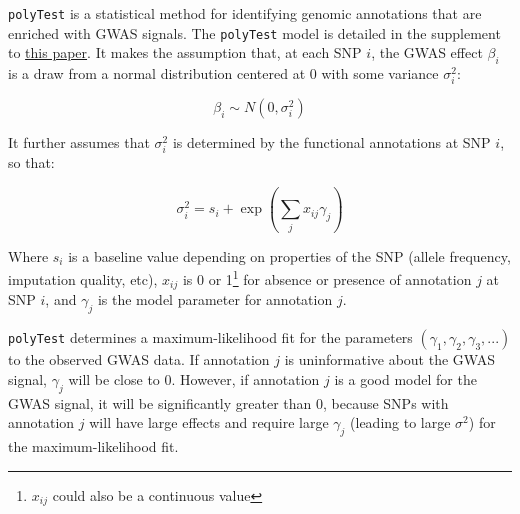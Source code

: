 \documentclass[12pt]{scrartcl}
\begin{document}
\maketitle

\texttt{polyTest} is a statistical method for identifying genomic annotations
that are enriched with GWAS signals. The \texttt{polyTest} model is detailed in
the supplement to
\href{http://science.sciencemag.org/content/352/6285/600}{this paper}. It
makes the assumption that, at each SNP $i$, the GWAS effect
$\beta_i$ is a draw from a normal distribution centered at 0 with some
variance $\sigma^2_i$:

\[\beta_i \sim N(0,\sigma^2_i)\]

It further assumes that $\sigma^2_i$ is determined by the functional
annotations at SNP $i$, so that:

\[\sigma^2_i = s_i + \exp(\sum_j x_{ij} \gamma_j)\]

Where $s_i$ is a baseline value depending on properties of the SNP (allele
frequency, imputation quality, etc),  $x_{ij}$ is 0 or 1\footnote[1]{$x_{ij}$
could also be a continuous value} for absence or presence of annotation $j$ at
SNP $i$, and $\gamma_j$ is the model parameter for annotation $j$.

\texttt{polyTest} determines a maximum-likelihood fit for the parameters
$(\gamma_1, \gamma_2, \gamma_3, ...)$ to the observed GWAS data.
If annotation $j$ is uninformative about the GWAS signal, $\gamma_j$ will be
close to 0. However, if annotation $j$ is a good model for the GWAS signal, it
will be significantly greater than 0, because SNPs with annotation $j$ will
have large effects and require large $\gamma_j$ (leading to large $\sigma^2$)
for the maximum-likelihood fit.
\end{document}
